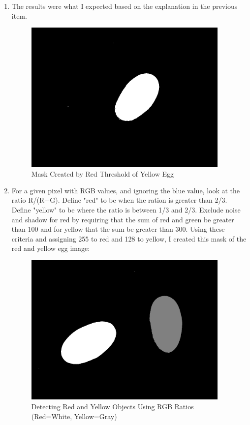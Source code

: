 \documentclass{article}
\begin{document}
\begin{enumerate}
\item
The results were what I expected based on the explanation in the previous item.
\begin{figure}[ht!]
\centering
\includegraphics[width=100mm]{yellowEggThresholded175.png}
\caption{Mask Created by Red Threshold of Yellow Egg}
\label{overflow}
\end{figure}


\item
For a given pixel with RGB values, and ignoring the blue value, look at the ratio R/(R+G). Define "red" to be when the ration is greater than 2/3. Define "yellow" to be where the ratio is between 1/3 and 2/3. Exclude noise and shadow for red by requiring that the sum of red and green be greater than 100 and for yellow that the sum be greater than 300. Using these criteria and assigning 255 to red and 128 to yellow, I created this mask of the red and yellow egg image:
\begin{figure}[ht!]
\centering
\includegraphics[width=100mm]{detectRedAndYellowEgg.png}
\caption{Detecting Red and Yellow Objects Using RGB Ratios (Red=White, Yellow=Gray)}
\label{overflow}
\end{figure}



\end{enumerate}
\end{document}
